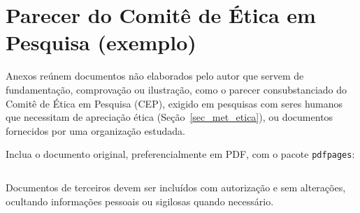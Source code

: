\begin{anexosenv}
\label{anexos}

\chapter{Parecer do Comitê de Ética em Pesquisa (exemplo)}
\label{anexoA}

Anexos reúnem documentos não elaborados pelo autor que servem de fundamentação, comprovação ou ilustração, como o parecer consubstanciado do Comitê de Ética em Pesquisa (CEP), exigido em pesquisas com seres humanos que necessitam de apreciação ética (Seção~\ref{sec_met_etica}), ou documentos fornecidos por uma organização estudada.

Inclua o documento original, preferencialmente em PDF, com o pacote \texttt{pdfpages}:

\begin{Verbatim}[fontsize=\small,frame=single]

\end{Verbatim}

Documentos de terceiros devem ser incluídos com autorização e sem alterações, ocultando informações pessoais ou sigilosas quando necessário.

\end{anexosenv}
